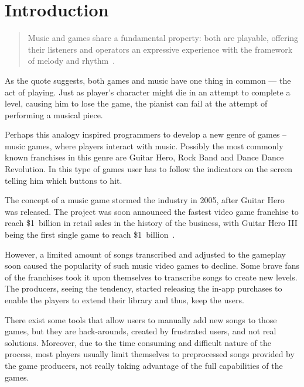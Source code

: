 
\chapter{Introduction} %

\label{Chapter3} %



\begin{quotation}
Music and games share a fundamental property: both are playable, offering their listeners and operators an expressive experience with the framework of melody and rhythm~\cite{introquote}.
\end{quotation} 

As the quote suggests, both games and music have one thing in common — the act of playing. Just as player’s character might die in an attempt to complete a level, causing him to lose the game, the pianist can fail at the attempt of performing a musical piece. 

Perhaps this analogy inspired programmers to develop a new genre of games -- music games, where players interact with music. Possibly the most commonly known franchises in this genre are Guitar Hero, Rock Band and Dance Dance Revolution. In this type of games user has to follow the indicators on the screen telling him which buttons to hit. 

The concept of a music game stormed the industry in 2005, after Guitar Hero was released. The project was soon announced the fastest video game franchise to reach \$1~billion in retail sales in the history of the business, with Guitar Hero III being the first single game to reach \$1~billion~\cite{GHSales}.

However, a limited amount of songs transcribed and adjusted to the gameplay soon caused the popularity of such music video games to decline. Some brave fans of the franchises took it upon themselves to transcribe songs to create new levels. The producers, seeing the tendency, started releasing the in-app purchases to enable the players to extend their library and thus, keep the users. 

There exist some tools that allow users to manually add new songs to those games, but they are hack-arounds, created by frustrated users, and not real solutions. Moreover, due to the time consuming and difficult nature of the process, most players usually limit themselves to preprocessed songs provided by the game producers, not really taking advantage of the full capabilities of the games. 

